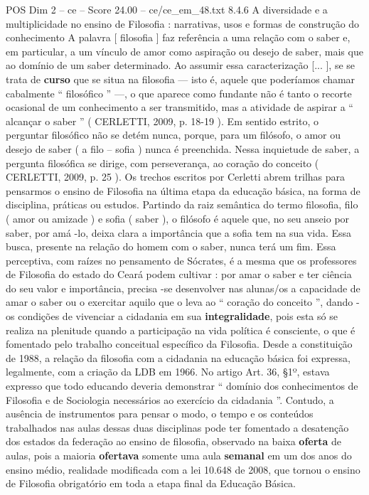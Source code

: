 \begin{textsample}{POS Dim 2 – ce – Score 24.00 – ce/ce\_em\_48.txt}  \label{ex:f2_pos_089}
8.4.6 A diversidade e a multiplicidade no ensino de Filosofia : narrativas, usos e formas de construção do conhecimento A palavra [ filosofia ] faz referência a uma relação com o saber e, em particular, a um vínculo de amor como aspiração ou desejo de saber, mais que ao domínio de um saber determinado.
Ao assumir essa caracterização [... ], se se trata de \textbf{curso} que se situa na filosofia — isto é, aquele que poderíamos chamar cabalmente “ filosófico ” —, o que aparece como fundante não é tanto o recorte ocasional de um conhecimento a ser transmitido, mas a atividade de aspirar a “ alcançar o saber ” ( CERLETTI, 2009, p. 18-19 ).
Em sentido estrito, o perguntar filosófico não se detém nunca, porque, para um filósofo, o amor ou desejo de saber ( a filo – sofia ) nunca é preenchida.
Nessa inquietude de saber, a pergunta filosófica se dirige, com perseverança, ao coração do conceito ( CERLETTI, 2009, p. 25 ).
Os trechos escritos por Cerletti abrem trilhas para pensarmos o ensino de Filosofia na última etapa da educação básica, na forma de disciplina, práticas ou estudos.
Partindo da raiz semântica do termo filosofia, filo ( amor ou amizade ) e sofia ( saber ), o filósofo é aquele que, no seu anseio por saber, por amá -lo, deixa clara a importância que a sofia tem na sua vida.
Essa busca, presente na relação do homem com o saber, nunca terá um fim.
Essa perceptiva, com raízes no pensamento de Sócrates, é a mesma que os professores de Filosofia do estado do Ceará podem cultivar : por amar o saber e ter ciência do seu valor e importância, precisa -se desenvolver nas alunas/os a capacidade de amar o saber ou o exercitar aquilo que o leva ao “ coração do conceito ”, dando -os condições de vivenciar a cidadania em sua \textbf{integralidade}, pois esta só se realiza na plenitude quando a participação na vida política é consciente, o que é fomentado pelo trabalho conceitual específico da Filosofia.
Desde a constituição de 1988, a relação da filosofia com a cidadania na educação básica foi expressa, legalmente, com a criação da LDB em 1966.
No artigo Art. 36, §1º, estava expresso que todo educando deveria demonstrar “ domínio dos conhecimentos de Filosofia e de Sociologia necessários ao exercício da cidadania ”.
Contudo, a ausência de instrumentos para pensar o modo, o tempo e os conteúdos trabalhados nas aulas dessas duas disciplinas pode ter fomentado a desatenção dos estados da federação ao ensino de filosofia, observado na baixa \textbf{oferta} de aulas, pois a maioria \textbf{ofertava} somente uma aula \textbf{semanal} em um dos anos do ensino médio, realidade modificada com a lei 10.648 de 2008, que tornou o ensino de Filosofia obrigatório em toda a etapa final da Educação Básica.

\end{textsample}
